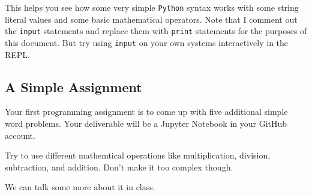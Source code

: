 \documentclass[a4paper,11pt,final]{article}
\begin{document}
This helps you see how some very simple \texttt{Python} syntax works
with some string literal values and some basic mathematical operators.
Note that I comment out the \texttt{input} statements and replace them
with \texttt{print} statements for the purposes of this document. But
try using \texttt{input} on your own systems interactively in the REPL.

\subsection{A Simple Assignment}\label{a-simple-assignment}

Your first programming assignment is to come up with five additional
simple word problems. Your deliverable will be a Jupyter Notebook in
your GitHub account.

Try to use different mathemtical operations like multiplication,
division, subtraction, and addition. Don't make it too complex though.

We can talk some more about it in class.
\end{document}

